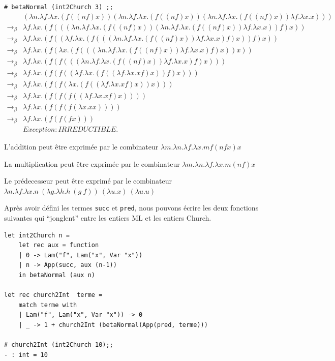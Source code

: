 \documentclass[11pt]{book}
\begin{document}
\verb+# betaNormal (int2Church 3) ;;+
$$
\begin{array}{ll}
 & (\lambda n . \lambda f . \lambda x . (f((nf)x))(\lambda n . \lambda f . \lambda x . (f((nf)x))(\lambda n . \lambda f . \lambda x . (f((nf)x))\lambda f . \lambda x . x)))   \\
\rightarrow _\beta & \lambda f . \lambda x . (f(((\lambda n . \lambda f . \lambda x . (f((nf)x))(\lambda n . \lambda f . \lambda x . (f((nf)x))\lambda f . \lambda x . x))f)x))   \\
\rightarrow _\beta & \lambda f . \lambda x . (f((\lambda f . \lambda x . (f(((\lambda n . \lambda f . \lambda x . (f((nf)x))\lambda f . \lambda x . x)f)x))f)x))   \\
\rightarrow _\beta & \lambda f . \lambda x . (f(\lambda x . (f(((\lambda n . \lambda f . \lambda x . (f((nf)x))\lambda f . \lambda x . x)f)x))x))   \\
\rightarrow _\beta & \lambda f . \lambda x . (f(f(((\lambda n . \lambda f . \lambda x . (f((nf)x))\lambda f . \lambda x . x)f)x)))   \\
\rightarrow _\beta & \lambda f . \lambda x . (f(f((\lambda f . \lambda x . (f((\lambda f . \lambda x . xf)x))f)x)))   \\
\rightarrow _\beta & \lambda f . \lambda x . (f(f(\lambda x . (f((\lambda f . \lambda x . xf)x))x)))   \\
\rightarrow _\beta & \lambda f . \lambda x . (f(f(f((\lambda f . \lambda x . xf)x))))   \\
\rightarrow _\beta & \lambda f . \lambda x . (f(f(f(\lambda x . xx))))   \\
\rightarrow _\beta & \lambda f . \lambda x . (f(f(fx)))   \\
& Exception: IRREDUCTIBLE. 
\end{array}
$$

L'addition peut être  exprimée par le combinateur $\lambda m .\lambda n .\lambda f. \lambda x. m f (n f x) x$ 


La multiplication peut être exprimée par le combinateur $\lambda m .\lambda n .\lambda f. \lambda x. m (n f) x $ 


Le prédecesseur peut être exprimé par le combinateur $\lambda n.\lambda f.\lambda x.n\ (\lambda g.\lambda h.h\ (g\ f))\ (\lambda u.x)\ (\lambda u.u) $ 


Après avoir défini les termes \verb+succ+ et \verb+pred+, nous pouvons écrire les deux fonctions suivantes qui ``jonglent''
entre les entiers ML et les entiers Church.
\begin{Verbatim}
let int2Church n = 
	let rec aux = function
	| 0 -> Lam("f", Lam("x", Var "x"))
	| n -> App(succ, aux (n-1))
	in betaNormal (aux n)

let rec church2Int  terme = 
	match terme with
	| Lam("f", Lam("x", Var "x")) -> 0
	| _ -> 1 + church2Int (betaNormal(App(pred, terme)))

# church2Int (int2Church 10);;
- : int = 10
\end{Verbatim}
\end{document}
